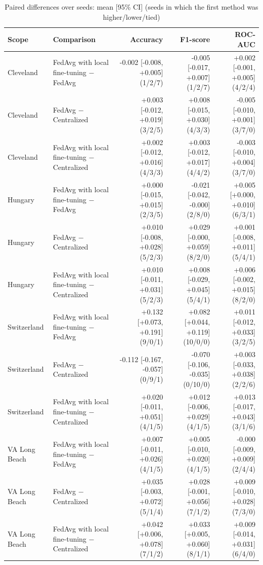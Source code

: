 \begin{table}[ht]
\centering
\small
\caption{Paired differences over seeds: mean [95\% CI] (seeds in which the first method was higher/lower/tied)}
\label{tab:table3_paired_differences}
\begin{tabular}{llrrr}
\toprule
Scope & Comparison & Accuracy & F1-score & ROC-AUC \\
\midrule
Cleveland & FedAvg with local fine-tuning $-$ FedAvg & -0.002 [-0.008, +0.005] (1/2/7) & -0.005 [-0.017, +0.007] (1/2/7) & +0.002 [-0.001, +0.005] (4/2/4) \\
Cleveland & FedAvg $-$ Centralized & +0.003 [-0.012, +0.019] (3/2/5) & +0.008 [-0.015, +0.030] (4/3/3) & -0.005 [-0.010, +0.001] (3/7/0) \\
Cleveland & FedAvg with local fine-tuning $-$ Centralized & +0.002 [-0.012, +0.016] (4/3/3) & +0.003 [-0.012, +0.017] (4/4/2) & -0.003 [-0.010, +0.004] (3/7/0) \\
Hungary & FedAvg with local fine-tuning $-$ FedAvg & +0.000 [-0.015, +0.015] (2/3/5) & -0.021 [-0.042, -0.000] (2/8/0) & +0.005 [+0.000, +0.010] (6/3/1) \\
Hungary & FedAvg $-$ Centralized & +0.010 [-0.008, +0.028] (5/2/3) & +0.029 [-0.000, +0.059] (8/2/0) & +0.001 [-0.008, +0.011] (5/4/1) \\
Hungary & FedAvg with local fine-tuning $-$ Centralized & +0.010 [-0.011, +0.031] (5/2/3) & +0.008 [-0.029, +0.045] (5/4/1) & +0.006 [-0.002, +0.015] (8/2/0) \\
Switzerland & FedAvg with local fine-tuning $-$ FedAvg & +0.132 [+0.073, +0.191] (9/0/1) & +0.082 [+0.044, +0.119] (10/0/0) & +0.011 [-0.012, +0.033] (3/2/5) \\
Switzerland & FedAvg $-$ Centralized & -0.112 [-0.167, -0.057] (0/9/1) & -0.070 [-0.106, -0.035] (0/10/0) & +0.003 [-0.033, +0.038] (2/2/6) \\
Switzerland & FedAvg with local fine-tuning $-$ Centralized & +0.020 [-0.011, +0.051] (4/1/5) & +0.012 [-0.006, +0.029] (4/1/5) & +0.013 [-0.017, +0.043] (3/1/6) \\
VA Long Beach & FedAvg with local fine-tuning $-$ FedAvg & +0.007 [-0.011, +0.026] (4/1/5) & +0.005 [-0.010, +0.020] (4/1/5) & -0.000 [-0.009, +0.009] (2/4/4) \\
VA Long Beach & FedAvg $-$ Centralized & +0.035 [-0.003, +0.072] (5/1/4) & +0.028 [-0.001, +0.056] (7/1/2) & +0.009 [-0.010, +0.028] (7/3/0) \\
VA Long Beach & FedAvg with local fine-tuning $-$ Centralized & +0.042 [+0.006, +0.078] (7/1/2) & +0.033 [+0.005, +0.060] (8/1/1) & +0.009 [-0.014, +0.031] (6/4/0) \\

\end{tabular}
\end{table}
